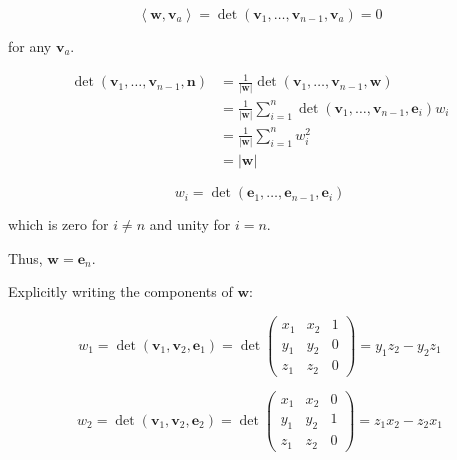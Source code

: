 \documentclass[12pt]{article}
\begin{document}
\begin{equation}
    \left\langle \mathbf{w}, \mathbf{v}_{a} \right\rangle = \det(\mathbf{v}_{1}, \dots, \mathbf{v}_{n-1}, \mathbf{v}_{a}) = 0
\end{equation}

for any $\mathbf{v}_{a}$.


\begin{equation}
    \begin{split}
        \det(\mathbf{v}_{1}, \dots, \mathbf{v}_{n-1}, \mathbf{n}) &= \frac{1}{\left\lvert \mathbf{w} \right\rvert} \det(\mathbf{v}_{1}, \dots, \mathbf{v}_{n-1}, \mathbf{w}) \\
        &= \frac{1}{\left\lvert \mathbf{w} \right\rvert} \sum_{i=1}^{n} \det(\mathbf{v}_{1}, \dots, \mathbf{v}_{n-1}, \mathbf{e}_{i}) w_{i} \\
        &= \frac{1}{\left\lvert \mathbf{w} \right\rvert} \sum_{i=1}^{n} w_{i}^{2} \\
        &= \left\lvert \mathbf{w} \right\rvert
    \end{split}
\end{equation}


\begin{equation}
    w_{i} = \det(\mathbf{e}_{1}, \dots, \mathbf{e}_{n-1}, \mathbf{e}_{i})
\end{equation}

which is zero for $i \ne n$ and unity for $i = n$.

Thus, $\mathbf{w} = \mathbf{e}_{n}$.

Explicitly writing the components of $\mathbf{w}$:

\begin{equation}
    w_{1} = \det(\mathbf{v}_{1}, \mathbf{v}_{2}, \mathbf{e}_{1}) = \det \begin{pmatrix}
        x_{1} & x_{2} & 1 \\
        y_{1} & y_{2} & 0 \\
        z_{1} & z_{2} & 0
    \end{pmatrix} = y_{1}z_{2} - y_{2}z_{1}
\end{equation}

\begin{equation}
    w_{2} = \det(\mathbf{v}_{1}, \mathbf{v}_{2}, \mathbf{e}_{2}) = \det \begin{pmatrix}
        x_{1} & x_{2} & 0 \\
        y_{1} & y_{2} & 1 \\
        z_{1} & z_{2} & 0
    \end{pmatrix} = z_{1}x_{2} - z_{2}x_{1}
\end{equation}
\end{document}
